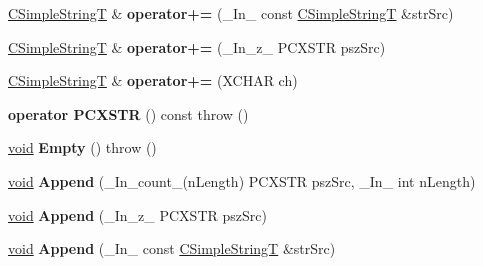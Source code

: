\begin{DoxyCompactItemize}
\mbox{\label{class_a_t_l_1_1_c_simple_string_t_a51b826ce1b653e84c712745ec5a2faa5}} 
\hyperlink{class_a_t_l_1_1_c_simple_string_t}{C\+Simple\+StringT} \& {\bfseries operator+=} (\+\_\+\+In\+\_\+ const \hyperlink{class_a_t_l_1_1_c_simple_string_t}{C\+Simple\+StringT} \&str\+Src)
\item 
\mbox{\label{class_a_t_l_1_1_c_simple_string_t_afdf53088ff6b58852c524487162a1b88}} 
\hyperlink{class_a_t_l_1_1_c_simple_string_t}{C\+Simple\+StringT} \& {\bfseries operator+=} (\+\_\+\+In\+\_\+z\+\_\+ P\+C\+X\+S\+TR psz\+Src)
\item 
\mbox{\label{class_a_t_l_1_1_c_simple_string_t_ac53aef03767dddf52ddf6af6d06be308}} 
\hyperlink{class_a_t_l_1_1_c_simple_string_t}{C\+Simple\+StringT} \& {\bfseries operator+=} (X\+C\+H\+AR ch)
\item 
\mbox{\label{class_a_t_l_1_1_c_simple_string_t_a4bde9735ff9e75986026b6e3cac67a31}} 
{\bfseries operator P\+C\+X\+S\+TR} () const  throw ()
\item 
\mbox{\label{class_a_t_l_1_1_c_simple_string_t_aa368b6429de4f6b8d15c8b8bb5a429ac}} 
\hyperlink{interfacevoid}{void} {\bfseries Empty} ()  throw ()
\item 
\mbox{\label{class_a_t_l_1_1_c_simple_string_t_a0282a0acc6b18d0002b66816ba2f594d}} 
\hyperlink{interfacevoid}{void} {\bfseries Append} (\+\_\+\+In\+\_\+count\+\_\+(n\+Length) P\+C\+X\+S\+TR psz\+Src, \+\_\+\+In\+\_\+ int n\+Length)
\item 
\mbox{\label{class_a_t_l_1_1_c_simple_string_t_acdc68aa5aa4f6f9c64bc903d97bb7c30}} 
\hyperlink{interfacevoid}{void} {\bfseries Append} (\+\_\+\+In\+\_\+z\+\_\+ P\+C\+X\+S\+TR psz\+Src)
\item 
\mbox{\label{class_a_t_l_1_1_c_simple_string_t_a231cc30f2f5a94b8732c8a2ec8a5b942}} 
\hyperlink{interfacevoid}{void} {\bfseries Append} (\+\_\+\+In\+\_\+ const \hyperlink{class_a_t_l_1_1_c_simple_string_t}{C\+Simple\+StringT} \&str\+Src)

\end{DoxyCompactItemize}
